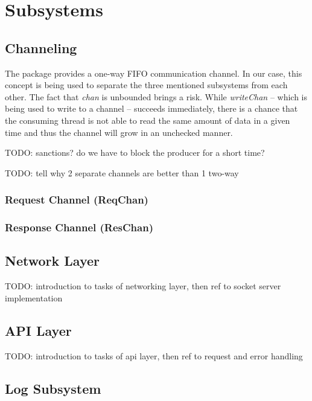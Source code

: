 \section{Subsystems}

\subsection{Channeling}

The
package provides a one-way FIFO communication channel. In
our case, this concept is being used to separate the
three mentioned subsystems from each other. The fact that
\textit{chan} is unbounded brings a risk. While
\textit{writeChan} -- which is being used to write to a
channel -- succeeds immediately, there is a chance that the
consuming thread is not able to read the same amount of
data in a given time and thus the channel will grow in
an unchecked manner. \cite{o2008real}

TODO: sanctions? do we have to block the producer for a short time?

TODO: tell why 2 separate channels are better than 1 two-way

\subsubsection{Request Channel (ReqChan)}

\subsubsection{Response Channel (ResChan)}


\subsection{Network Layer}

TODO: introduction to tasks of networking layer, then ref to socket server implementation

\subsection{API Layer}

TODO: introduction to tasks of api layer, then ref to request and error handling

\subsection{Log Subsystem}

